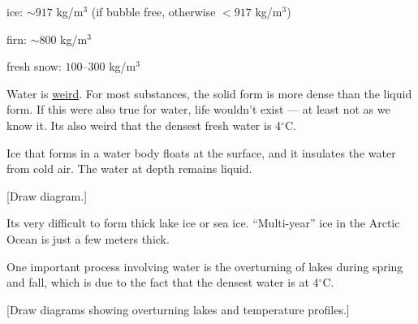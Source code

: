 ice: $\sim 917$ kg/m$^3$ (if bubble free, otherwise $<917$ kg/m$^3$)

firn: $\sim 800$ kg/m$^3$

fresh snow: $100$--$300$ kg/m$^3$

Water is \underline{weird}. For most substances, the solid form is more dense than the liquid form. If this were also true for water, life wouldn't exist --- at least not as we know it. Its also weird that the densest fresh water is 4$^\circ$C.

Ice that forms in a water body floats at the surface, and it insulates the water from cold air. The water at depth remains liquid.

[Draw diagram.]
\vspace{5cm}

Its very difficult to form thick lake ice or sea ice. ``Multi-year'' ice in the Arctic Ocean is just a few meters thick.

One important process involving water is the overturning of lakes during spring and fall, which is due to the fact that the densest water is at 4$^\circ$C.

[Draw diagrams showing overturning lakes and temperature profiles.]
\vspace{5cm}


\clearpage
